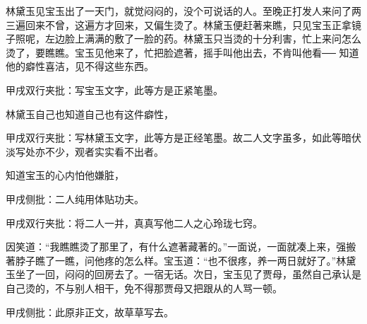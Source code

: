 \begin{parag}
    林黛玉见宝玉出了一天门，就觉闷闷的，没个可说话的人。至晚正打发人来问了两三遍回来不曾，这遍方才回来，又偏生烫了。林黛玉便赶著来瞧，只见宝玉正拿镜子照呢，左边脸上满满的敷了一脸的药。林黛玉只当烫的十分利害，忙上来问怎么烫了，要瞧瞧。宝玉见他来了，忙把脸遮著，摇手叫他出去，不肯叫他看── 知道他的癖性喜洁，见不得这些东西。\begin{note}甲戌双行夹批：写宝玉文字，此等方是正紧笔墨。\end{note}林黛玉自己也知道自己也有这件癖性，\begin{note}甲戌双行夹批：写林黛玉文字，此等方是正经笔墨。故二人文字虽多，如此等暗伏淡写处亦不少，观者实实看不出者。\end{note}知道宝玉的心内怕他嫌脏，\begin{note}甲戌侧批：二人纯用体贴功夫。\end{note}\begin{note}甲戌双行夹批：将二人一并，真真写他二人之心玲珑七窍。\end{note}因笑道：“我瞧瞧烫了那里了，有什么遮著藏著的。”一面说，一面就凑上来，强搬著脖子瞧了一瞧，问他疼的怎么样。宝玉道：“也不很疼，养一两日就好了。”林黛玉坐了一回，闷闷的回房去了。一宿无话。次日，宝玉见了贾母，虽然自己承认是自己烫的，不与别人相干，免不得那贾母又把跟从的人骂一顿。\begin{note}甲戌侧批：此原非正文，故草草写去。\end{note}
\end{parag}


